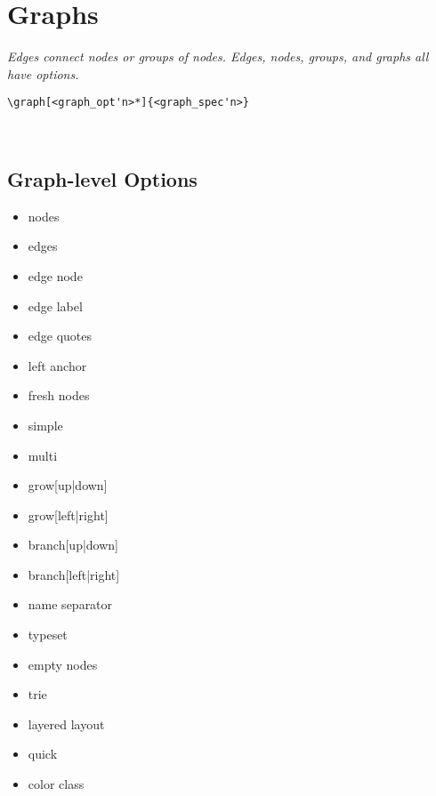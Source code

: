 \section{Graphs}

\textit{Edges connect nodes or groups of nodes. Edges, nodes, groups, and graphs all have options.}\\
\begin{minipage}{6.5cm}\begin{lstlisting}
\graph[<graph_opt'n>*]{<graph_spec'n>} 
\end{lstlisting}\end{minipage}

\\


\subsection*{Graph-level Options}
{\scriptsize \begin{multicols}{3}\begin{itemize}[leftmargin=0mm,label={}]
    \item nodes 
    \item edges 
    \item edge node 
    \item edge label
    \item edge quotes
    \item left anchor 
    \item fresh nodes 
    \item simple 
    \item multi 
    \item grow[up|down]
    \item grow[left|right]
    \item branch[up|down]
    \item branch[left|right]
    \item name separator
    \item typeset   
    \item empty nodes
    \item trie
    \item layered layout
    \item quick
    \item color class
\end{itemize}\end{multicols}}
\\
\\



